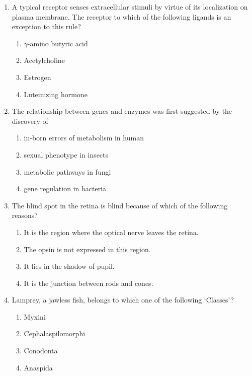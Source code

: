 \documentclass[journal,12pt,onecolumn]{IEEEtran}
\begin{document}
\begin{enumerate}[label=\arabic*.]
\item A typical receptor senses extracellular stimuli by virtue of its localization on plasma membrane. The receptor to which of the following ligands is an exception to this rule?
\begin{multicols}{2}
\begin{enumerate}[label=(\Alph*)]
\item $\gamma$-amino butyric acid
\item Acetylcholine
\item Estrogen
\item Luteinizing hormone
\end{enumerate}
\end{multicols}

\item The relationship between genes and enzymes was first suggested by the discovery of
\begin{enumerate}[label=(\Alph*)]
\item in-born errors of metabolism in human
\item sexual phenotype in insects
\item metabolic pathways in fungi
\item gene regulation in bacteria
\end{enumerate}

\item The blind spot in the retina is blind because of which of the following reasons?
\begin{enumerate}[label=(\Alph*)]
\item It is the region where the optical nerve leaves the retina.
\item The opsin is not expressed in this region.
\item It lies in the shadow of pupil.
\item It is the junction between rods and cones.
\end{enumerate}

\item Lamprey, a jawless fish, belongs to which one of the following ‘Classes’?
\begin{multicols}{2}
\begin{enumerate}[label=(\Alph*)]
\item Myxini
\item Cephalaspilomorphi
\item Conodonta
\item Anaspida
\end{enumerate}
\end{multicols}


\end{enumerate}
\end{document}
